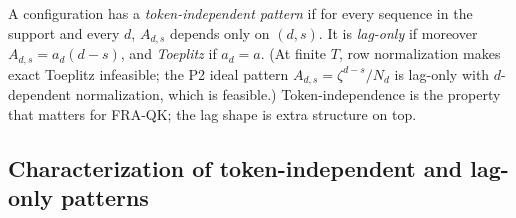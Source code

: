\documentclass{article}
\begin{document}
\begin{definition}
A configuration has a \emph{token-independent pattern} if for every sequence in the support and every $d$, $A_{d,s}$ depends only on $(d,s)$. It is \emph{lag-only} if moreover $A_{d,s} = a_d(d-s)$, and \emph{Toeplitz} if $a_d = a$. (At finite $T$, row normalization makes exact Toeplitz infeasible; the P2 ideal pattern $A_{d,s} = \zeta^{d-s}/N_d$ is lag-only with $d$-dependent normalization, which is feasible.) Token-independence is the property that matters for FRA-QK; the lag shape is extra structure on top.
\end{definition}

\subsection{Characterization of token-independent and lag-only patterns}
\end{document}
